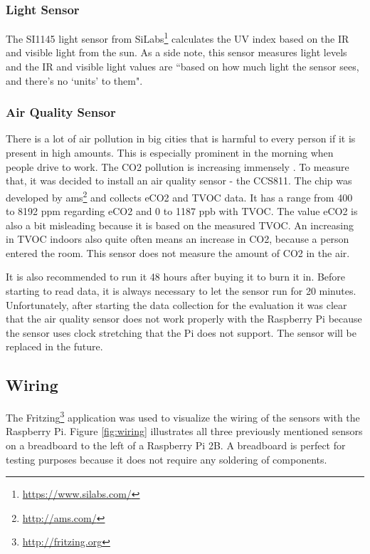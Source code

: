 \documentclass{article}      %
\begin{document}
\subsubsection{Light Sensor} 

The SI1145 light sensor from SiLabs\footnote{\url{https://www.silabs.com/}} calculates the \gls{UV} index based on the \gls{IR} and visible light from the sun. As a side note, this sensor measures light levels and the \gls{IR} and visible light values are ``based on how much light the sensor sees, and there's no `units' to them". \cite{si1145}

\subsubsection{Air Quality Sensor} \label{sec:airQual}

There is a lot of air pollution in big cities that is harmful to every person if it is present in high amounts. This is especially prominent in the morning when people drive to work. The \gls{CO2} pollution is increasing immensely \cite{carWork}. To measure that, it was decided to install an air quality sensor - the CCS811. The chip was developed by ams\footnote{\url{http://ams.com/}} and collects \acrfull{eCO2} and \acrfull{TVOC} data. It has a range from  400 to 8192 \gls{ppm} regarding \gls{eCO2} and 0 to 1187 \gls{ppb} with \gls{TVOC}. The value \gls{eCO2} is also a bit misleading because it is based on the measured \gls{TVOC}. An increasing in \gls{TVOC} indoors also quite often means an increase in \gls{CO2}, because a person entered the room. This sensor does not measure the amount of \gls{CO2} in the air.

It is also recommended to run it 48 hours after buying it to burn it in. Before starting to read data, it is always necessary to let the sensor run for 20 minutes. Unfortunately, after starting the data collection for the evaluation it was clear that the air quality sensor does not work properly with the Raspberry Pi because the sensor uses clock stretching that the Pi does not support. The sensor will be replaced in the future. \cite{ccs811}

\subsection{Wiring}

The Fritzing\footnote{\url{http://fritzing.org}} application was used to visualize the wiring of the sensors with the Raspberry Pi. Figure \ref{fig:wiring} illustrates all three previously mentioned sensors on a breadboard to the left of a Raspberry Pi 2B. A breadboard is perfect for testing purposes because it does not require any soldering of components.
\end{document}
